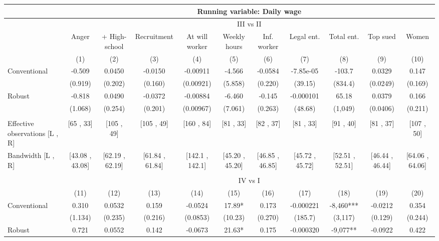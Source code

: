 \begin{tabular}{lcccccccccc}
\toprule
      & \multicolumn{10}{c}{Running variable: Daily wage} \\
\midrule
      & \multicolumn{10}{c}{III vs II} \\
\midrule
\midrule
      & Anger & + High-school & Recruitment & At will worker & Weekly hours & Inf. worker & Legal ent. & Total ent. & Top sued & Women \\
\midrule
      & (1)   & (2)   & (3)   & (4)   & (5)   & (6)   & (7)   & (8)   & (9)   & (10) \\
\midrule
\midrule
Conventional & -0.509 & 0.0450 & -0.0150 & -0.00911 & -4.566 & -0.0584 & -7.85e-05 & -103.7 & 0.0329 & 0.147 \\
      & (0.919) & (0.202) & (0.160) & (0.00921) & (5.858) & (0.220) & (39.15) & (834.4) & (0.0249) & (0.169) \\
Robust & -0.818 & 0.0490 & -0.0372 & -0.00884 & -6.460 & -0.145 & -0.000101 & 65.18 & 0.0379 & 0.166 \\
      & (1.068) & (0.254) & (0.201) & (0.00967) & (7.061) & (0.263) & (48.68) & (1,049) & (0.0406) & (0.211) \\
      &       &       &       &       &       &       &       &       &       &  \\
\midrule
Effective observations [L , R] & [65 , 33] & [105 , 49] & [105 , 49] & [160 , 84] & [81 , 33] & [82 , 37] & [81 , 33] & [91 , 40] & [81 , 37] & [107 , 50] \\
Bandwidth [L , R] & [43.08 , 43.08] & [62.19 , 62.19] & [61.84 , 61.84] & [142.1 , 142.1] & [45.20 , 45.20] & [46.85 , 46.85] & [45.72 , 45.72] & [52.51 , 52.51] & [46.44 , 46.44] & [64.06 , 64.06] \\
\midrule
\midrule
      &       &       &       &       &       &       &       &       &       &  \\
\midrule
      & \multicolumn{10}{c}{IV vs I} \\
\midrule
\midrule
      & (11)  & (12)  & (13)  & (14)  & (15)  & (16)  & (17)  & (18)  & (19)  & (20) \\
\midrule
\midrule
Conventional & 0.310 & 0.0532 & 0.159 & -0.0524 & 17.89* & 0.173 & -0.000221 & -8,460*** & -0.0212 & 0.354 \\
      & (1.134) & (0.235) & (0.216) & (0.0853) & (10.23) & (0.270) & (185.7) & (3,117) & (0.129) & (0.244) \\
Robust & 0.721 & 0.0552 & 0.142 & -0.0673 & 21.63* & 0.175 & -0.000320 & -9,077** & -0.0922 & 0.422 \\

\end{tabular}
